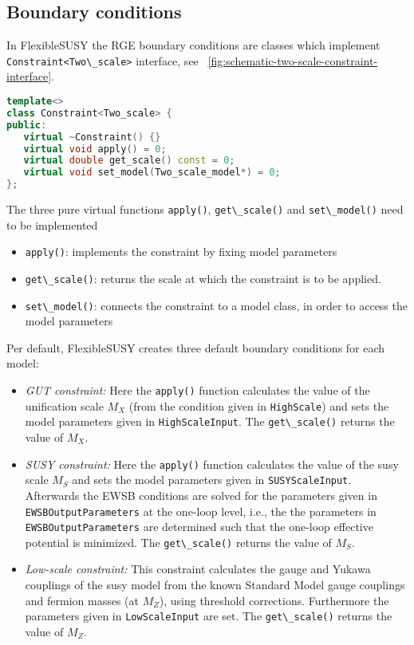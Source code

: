 \documentclass[final,3p,times,pdflatex]{elsarticle}
\newcommand{\fs}{FlexibleSUSY\xspace}
\newcommand{\code}[1]{\lstinline|#1|}  %
\begin{document}
\subsection{Boundary conditions}
In \fs the RGE boundary conditions are classes which implement
\code{Constraint<Two\_scale>} interface, see
\figurename~\ref{fig:schematic-two-scale-constraint-interface}.
%
\begin{lstlisting}[language=C++]
template<>
class Constraint<Two_scale> {
public:
   virtual ~Constraint() {}
   virtual void apply() = 0;
   virtual double get_scale() const = 0;
   virtual void set_model(Two_scale_model*) = 0;
};
\end{lstlisting}
%
The three pure virtual functions \code{apply()}, \code{get\_scale()}
and \code{set\_model()} need to be implemented
%
\begin{itemize}
\item \code{apply()}: implements the constraint by fixing model
  parameters
\item \code{get\_scale()}: returns the scale at which the constraint
  is to be applied.
\item \code{set\_model()}: connects the constraint to a model class,
  in order to access the model parameters
\end{itemize}
%
Per default, \fs creates three default boundary conditions for each
model:
%
\begin{itemize}
\item \emph{GUT constraint:} Here the \code{apply()} function
  calculates the value of the unification scale $M_X$ (from the
  condition given in \code{HighScale}) and sets the model parameters
  given in \code{HighScaleInput}.  The \code{get\_scale()} returns the
  value of $M_X$.
\item \emph{SUSY constraint:} Here the \code{apply()} function
  calculates the value of the susy scale $M_S$ and sets the model
  parameters given in \code{SUSYScaleInput}.  Afterwards the EWSB
  conditions are solved for the parameters given in
  \code{EWSBOutputParameters} at the one-loop level, i.e., the the
  parameters in \code{EWSBOutputParameters} are determined such that
  the one-loop effective potential is minimized.  The
  \code{get\_scale()} returns the value of $M_S$.
\item \emph{Low-scale constraint:} This constraint calculates the
  gauge and Yukawa couplings of the susy model from the known Standard
  Model gauge couplings and fermion masses (at $M_Z$), using threshold
  corrections.  Furthermore the parameters given in
  \code{LowScaleInput} are set.  The \code{get\_scale()} returns the
  value of $M_Z$.
\end{itemize}
\end{document}
